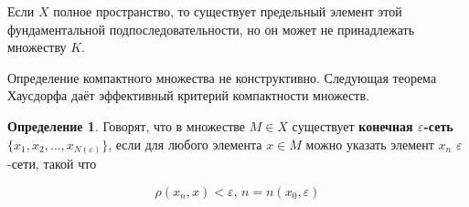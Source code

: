\documentclass[12pt,a4paper,titlepage, oneside]{book}
\theoremstyle{definition}
\newtheorem*{definition}{Определение}
\theoremstyle{plain}
\theoremstyle{remark}
\theoremstyle{remark}
\theoremstyle{remark}
\theoremstyle{remark}
\theoremstyle{plain}
\theoremstyle{plain}
\begin{document}
Если $X$ полное пространство, то существует предельный элемент этой фундаментальной подпоследовательности, но он может не принадлежать множеству $K$.

Определение компактного множества не конструктивно. Следующая теорема Хаусдорфа даёт эффективный критерий компактности множеств.

\begin{definition}
Говорят, что в множестве $M \in X$ существует \textbf{конечная $\varepsilon$-сеть $\lbrace x_1,x_2,\ldots,x_{N(\varepsilon)} \rbrace$}, если для любого элемента $x \in M$ можно указать элемент $x_n$ $\varepsilon$-сети, такой что

\begin{equation*}
\rho(x_n, x) < \varepsilon \mbox{, } n=n(x_0,\varepsilon)
\end{equation*}

\end{definition}
\end{document}
